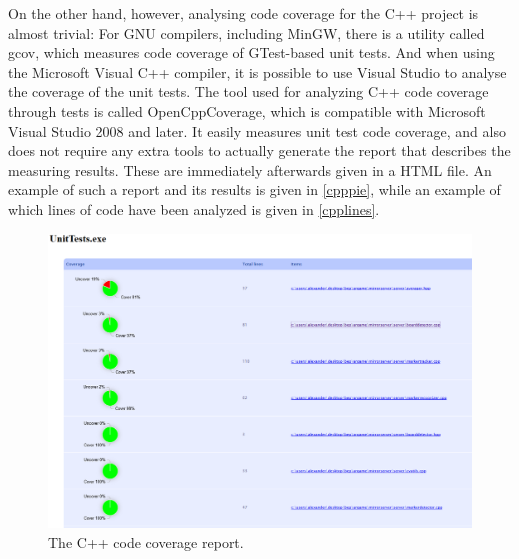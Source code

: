             On the other hand, however, analysing code coverage for the C++ 
            project is almost trivial: For GNU compilers, including MinGW, 
            there is a utility called gcov, which measures code coverage of 
            GTest-based unit tests. And when using the Microsoft Visual C++ 
            compiler, it is possible to use Visual Studio to analyse the 
            coverage of the unit tests. The tool used for analyzing C++
            code coverage through tests is called OpenCppCoverage, which
            is compatible with Microsoft Visual Studio 2008 and later.
            It easily measures unit test code coverage, and also does not
            require any extra tools to actually generate the report that
            describes the measuring results. These are immediately afterwards
            given in a HTML file. An example of such a report and its results
            is given in \ref{cpppie}, while an example of which lines of code have
            been analyzed is given in \ref{cpplines}.
            
            \begin{figure}[!ht]
            	\centering
            	\includegraphics[width=\textwidth]{CPPCoveragePie}
            	\caption{The C++ code coverage report.}
            	\label{fig:cpppie}
            \end{figure}
            
